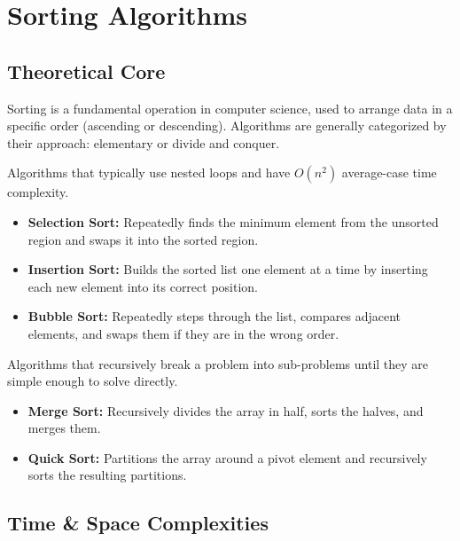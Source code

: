 \chapter{Sorting Algorithms}

\section{Theoretical Core}

Sorting is a fundamental operation in computer science, used to arrange data in a specific order (ascending or descending). Algorithms are generally categorized by their approach: elementary or divide and conquer.

\begin{definition}
    Algorithms that typically use nested loops and have $O(n^2)$ average-case time complexity.
    \begin{itemize}
        \item \textbf{Selection Sort:} Repeatedly finds the minimum element from the unsorted region and swaps it into the sorted region.
        \item \textbf{Insertion Sort:} Builds the sorted list one element at a time by inserting each new element into its correct position.
        \item \textbf{Bubble Sort:} Repeatedly steps through the list, compares adjacent elements, and swaps them if they are in the wrong order.
    \end{itemize}
\end{definition}

\begin{definition}
    Algorithms that recursively break a problem into sub-problems until they are simple enough to solve directly.
    \begin{itemize}
        \item \textbf{Merge Sort:} Recursively divides the array in half, sorts the halves, and merges them.
        \item \textbf{Quick Sort:} Partitions the array around a pivot element and recursively sorts the resulting partitions.
    \end{itemize}
\end{definition}

\section{Time \& Space Complexities}

